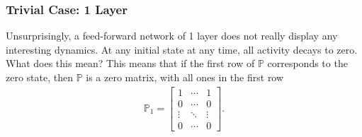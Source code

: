 \documentclass[superscriptaddress]{revtex4-1}
\newcommand{\prob}{\mathbb{P}}
\begin{document}
\subsubsection{Trivial Case: 1 Layer}
Unsurprisingly, a feed-forward network of 1 layer does not really display any interesting dynamics. At any initial state at any time, all activity decays to zero. What does this mean? This means that if the first row of $\prob$ corresponds to the zero state, then $\prob$ is a zero matrix, with all ones in the first row
\begin{align*}
\prob_1 = 
\begin{bmatrix}
1 & \dotsm & 1\\
0 & \dotsm & 0\\
\vdots & \ddots & \vdots\\
0 & \dotsm & 0
\end{bmatrix}.
\end{align*}
\end{document}
